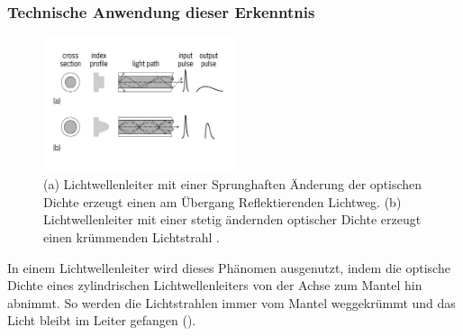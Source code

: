 \subsubsection{Technische Anwendung dieser Erkenntnis}
\begin{figure}[H]
\begin{center}
\includegraphics[width=0.5\textwidth]{./picture/Lichtwellenleiter.pdf}
	\caption{(a) Lichtwellenleiter mit einer Sprunghaften Änderung der optischen Dichte erzeugt einen am Übergang Reflektierenden Lichtweg. 
	(b) Lichtwellenleiter mit einer stetig ändernden optischer Dichte erzeugt einen krümmenden Lichtstrahl \cite{opticFibre}. }
	\label{lichtleiter}
\end{center}	
\end{figure}
In einem Lichtwellenleiter wird dieses Phänomen ausgenutzt, 
indem  die  optische  Dichte  eines  zylindrischen
Lichtwellenleiters  von  der Achse zum Mantel hin abnimmt.
So werden die Lichtstrahlen immer vom Mantel weggekrümmt 
und das Licht  bleibt im Leiter gefangen ().
